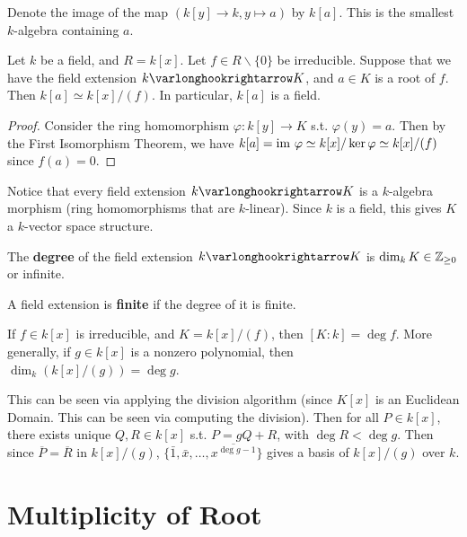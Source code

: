 \documentclass{article}
\begin{document}
\begin{notation}
    Denote the image of the map $(k[y] \to k, y \mapsto a)$ by $k[a]$. This is the smallest $k$-algebra containing $a$.
\end{notation}

\begin{proposition}
    Let $k$ be a field, and $R = k[x]$. Let $f \in R \smallsetminus \{0\}$ be irreducible. Suppose that we have the field extension $k \ext K$, and $a \in K$ is a root of $f$. Then $k[a] \simeq k[x]/(f)$. In particular, $k[a]$ is a field.
\end{proposition}

\begin{proof}
    Consider the ring homomorphism $\varphi: k[y] \to K$ s.t. $\varphi(y) = a$. Then by the First Isomorphism Theorem, we have $k[a] = \mathrm{im}\  \varphi \simeq k[x]/\ker \varphi \simeq k[x]/(f)$ since $f(a) = 0$. 
\end{proof}

\textstart
Notice that every field extension $k \ext K$ is a $k$-algebra morphism (ring homomorphisms that are $k$-linear). Since $k$ is a field, this gives $K$ a $k$-vector space structure.

\begin{definition}[Degree]
    The \textbf{degree} of the field extension $k \ext K$ is $\dim_k K \in \mathbb{Z}_{\geq 0}$ or infinite. 
\end{definition}
\nogap
\begin{definition}[Finite]
    A field extension is \textbf{finite} if the degree of it is finite. 
\end{definition}

\begin{example}
    If $f \in k[x]$ is irreducible, and $K = k[x]/(f)$, then $[K : k] = \deg f$. More generally, if $g \in k[x]$ is a nonzero polynomial, then $\dim_k(k[x]/(g)) = \deg g$.

    This can be seen via applying the division algorithm (since $K[x]$ is an Euclidean Domain. This can be seen via computing the division). Then for all $P \in k[x]$, there exists unique $Q, R \in k[x]$ s.t. $P = gQ + R$, with $\deg R < \deg g$. Then since $\overline{P} = \overline{R}$ in $k[x]/(g)$, $\{ \bar{1}, \bar{x}, \dots, \overline{x^{\deg g - 1}} \}$ gives a basis of $k[x]/(g)$ over $k$.
\end{example}

\section{Multiplicity of Root}
\end{document}
